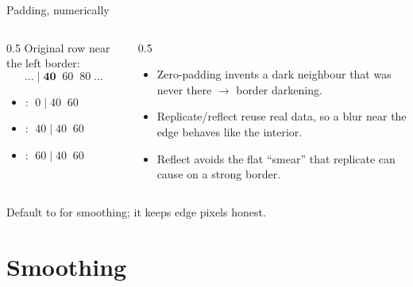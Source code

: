 \documentclass[10pt,aspectratio=169]{beamer}
\begin{document}
\begin{frame}{Padding, numerically}
  \begin{columns}[T]
    \begin{column}{0.5\textwidth}
      Original row near the left border:
      \[ \dots\;|\;\mathbf{40}\;\;60\;\;80\;\dots \]
      \begin{itemize}
        \item {}: $\;0\;|\;40\;\;60$
        \item {}: $\;40\;|\;40\;\;60$
        \item {}: $\;60\;|\;40\;\;60$
      \end{itemize}
    \end{column}
    \begin{column}{0.5\textwidth}
      \begin{itemize}
        \item Zero-padding invents a dark neighbour that was never there $\rightarrow$ border darkening.
        \item Replicate/reflect reuse real data, so a blur near the edge behaves like the interior.
        \item Reflect avoids the flat ``smear'' that replicate can cause on a strong border.
      \end{itemize}
    \end{column}
  \end{columns}
  \begin{goodbox}
    Default to  for smoothing; it keeps edge pixels honest.
  \end{goodbox}
\end{frame}

\section{Smoothing}
\end{document}
